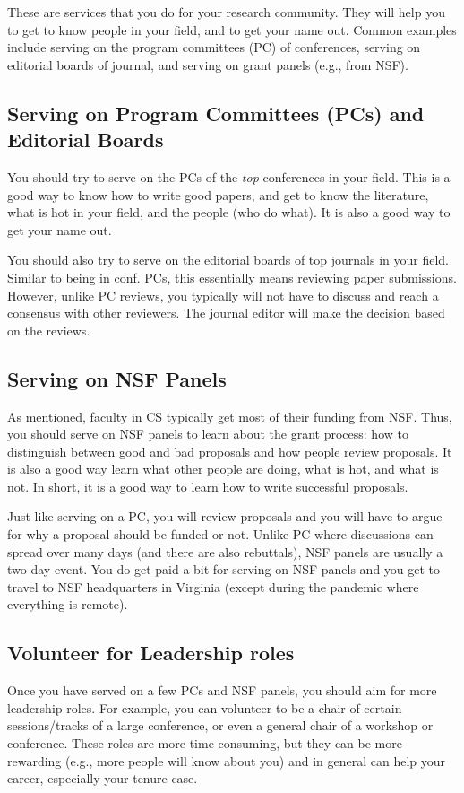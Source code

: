\documentclass[oneside,11pt,dvipsnames]{book}
\begin{document}
These are services that you do for your research community. They will help you to get to know people in your field, and to get your name out.  Common examples include serving on the program committees (PC) of conferences, serving on editorial boards of journal, and serving on grant panels (e.g., from NSF).

\subsection{Serving on Program Committees (PCs) and Editorial Boards} You should try to serve on the PCs  of the \emph{top} conferences in your field. This is a good way to know how to write good papers, and get to know the literature, what is hot in your field, and the people (who do what). It is also a good way to get your name out.  


You should also try to serve on the editorial boards of top journals in your field.
Similar to being in conf. PCs, this essentially means reviewing paper submissions. However, unlike PC reviews, you typically will not have to discuss and reach a consensus with other reviewers. The journal editor will make the decision based on the reviews. 

\subsection{Serving on NSF Panels} As mentioned, faculty in CS typically get most of their funding from NSF. Thus, you should serve on NSF panels to learn about the grant process: how to distinguish between good and bad proposals and how people review proposals.
It is also a good way learn what other people are doing, what is hot, and what is not. In short, it is a good way to learn how to write successful proposals.

Just like serving on a PC, you will review proposals and you will have to argue for why a proposal should be funded or not.  Unlike PC where discussions can spread over many days (and there are also rebuttals), NSF panels are usually a two-day event.  You do get paid a bit for serving on NSF panels and you get to travel to NSF headquarters in Virginia (except during the pandemic where everything is remote).



\subsection{Volunteer for Leadership roles} Once you have served on a few PCs and NSF panels, you should aim for more leadership roles.  For example, you can volunteer to be a chair of certain sessions/tracks of a large conference, or even a general chair of a workshop or conference.  These roles are more time-consuming, but they can be more rewarding (e.g., more people will know about you) and in general can help your career, especially your tenure case.
\end{document}
